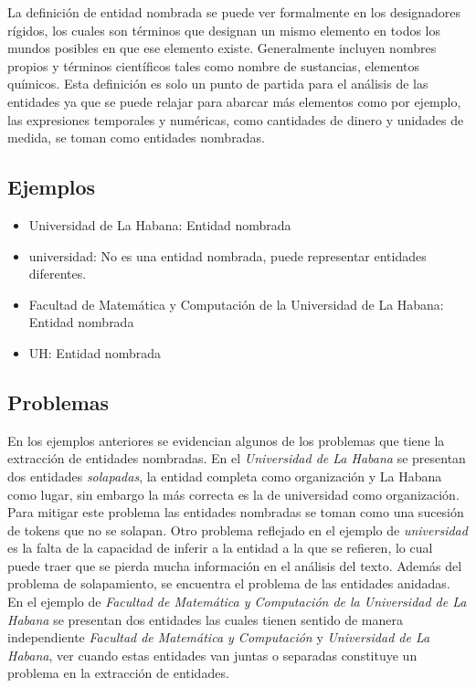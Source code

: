 \documentclass[runningheads]{llncs}
\begin{document}
La definición de entidad nombrada se puede ver formalmente en los designadores rígidos\cite{rigid_designator}, los cuales son términos que designan un mismo elemento en todos los mundos posibles en que ese elemento existe. Generalmente incluyen nombres propios y términos científicos tales como nombre de sustancias, elementos químicos. Esta definición es solo un punto de partida para el análisis de las entidades ya que se puede relajar  para abarcar más elementos como por ejemplo, las expresiones temporales y numéricas, como cantidades de dinero y unidades de medida, se toman como entidades nombradas. 

\subsection{Ejemplos}

\begin{itemize}

\item Universidad de La Habana: Entidad nombrada
\item universidad: No es una entidad nombrada, puede representar entidades diferentes.
\item Facultad de Matemática y Computación de la Universidad de La Habana: Entidad nombrada
\item UH: Entidad nombrada
\end{itemize}

\subsection{Problemas}

En los ejemplos anteriores se evidencian algunos de los problemas que tiene la extracción de entidades nombradas. En el \emph{Universidad de La Habana} se presentan dos entidades \emph{solapadas}, la entidad completa como organización y La Habana como lugar, sin embargo la más correcta es la de universidad como organización. Para mitigar este problema las entidades nombradas se toman como una sucesión de tokens que no se solapan. Otro problema reflejado en el ejemplo de \emph{universidad} es la falta de la capacidad de inferir a la entidad a la que se refieren, lo cual puede traer que se pierda mucha información en el análisis del texto. Además del problema de solapamiento, se encuentra el problema de las entidades anidadas. En el ejemplo de \emph{Facultad de Matemática y Computación de la Universidad de La Habana} se presentan dos entidades las cuales tienen sentido de manera independiente \emph{Facultad de Matemática y Computación} y \emph{Universidad de La Habana}, ver cuando estas entidades van juntas o separadas constituye un problema en la extracción de entidades.
\end{document}
